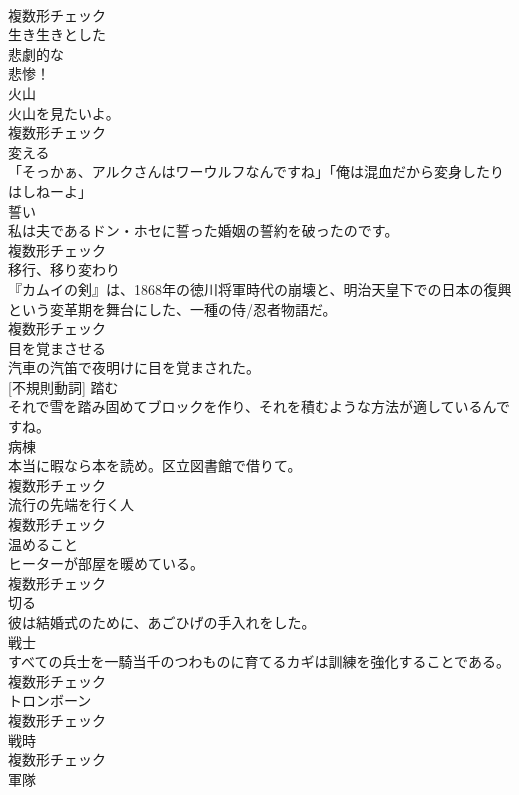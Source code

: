 \documentclass[8pt]{extreport}
\begin{document}
\begin{CJK}{UTF8}{min}
\\	複数形チェック
\\	[形容詞]	生き生きとした	
\\	[形容詞]	悲劇的な	
\\	悲惨！	
\\	[名詞]	火山	
\\	火山を見たいよ。	
\\	複数形チェック
\\	[動詞]	変える	
\\	「そっかぁ、アルクさんはワーウルフなんですね」「俺は混血だから変身したりはしねーよ」	
\\	[名詞]	誓い	
\\	私は夫であるドン・ホセに誓った婚姻の誓約を破ったのです。	
\\	複数形チェック
\\	[名詞]	移行、移り変わり	
\\	『カムイの剣』は、1868年の徳川将軍時代の崩壊と、明治天皇下での日本の復興という変革期を舞台にした、一種の侍/忍者物語だ。	
\\	複数形チェック
\\	[動詞]	目を覚まさせる	
\\	汽車の汽笛で夜明けに目を覚まされた。	
\\	[動詞] [不規則動詞]	踏む	
\\	それで雪を踏み固めてブロックを作り、それを積むような方法が適しているんですね。	
\\	[名詞]	病棟	
\\	本当に暇なら本を読め。区立図書館で借りて。	
\\	複数形チェック
\\	[名詞]	流行の先端を行く人	
\\	複数形チェック
\\	[名詞]	温めること	
\\	ヒーターが部屋を暖めている。	
\\	複数形チェック
\\	[動詞]	切る	
\\	彼は結婚式のために、あごひげの手入れをした。	
\\	[名詞]	戦士	
\\	すべての兵士を一騎当千のつわものに育てるカギは訓練を強化することである。	
\\	複数形チェック
\\	[名詞]	トロンボーン	
\\	複数形チェック
\\	[名詞]	戦時	
\\	複数形チェック
\\	[名詞]	軍隊	

\end{CJK}
\end{document}
